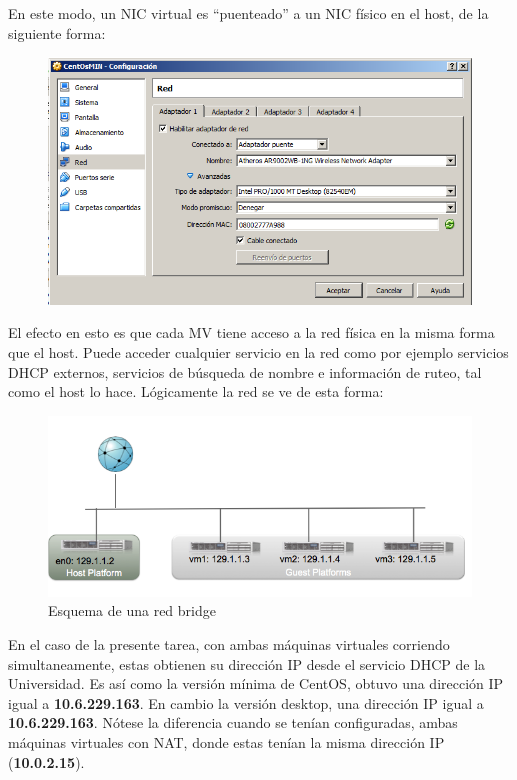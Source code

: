 \documentclass[11pt]{article}
\begin{document}
	En este modo, un NIC virtual es ``puenteado'' a un NIC físico en el host, de la siguiente forma:

	\begin{figure}[ht]
	\center
	\includegraphics[width=0.5\linewidth]{screenshots/MIN/bridge/bridge-mv-min.png}
	\end{figure}

	El efecto en esto es que cada MV tiene acceso a la red física en la misma forma que el host. Puede acceder cualquier servicio en la red como por ejemplo servicios DHCP externos, servicios de búsqueda de nombre e información de ruteo, tal como el host lo hace. Lógicamente la red se ve de esta forma:

	\begin{figure}[ht]
	\center
	\includegraphics[width=0.75\linewidth]{screenshots/bridge-network.png} 
	\caption{Esquema de una red bridge} 
	\end{figure}

En el caso de la presente tarea, con ambas máquinas virtuales corriendo simultaneamente, estas obtienen su dirección IP desde el servicio DHCP de la Universidad. Es así como la versión mínima de CentOS, obtuvo una dirección IP igual a \textbf{10.6.229.163}. En cambio la versión desktop, una dirección IP igual a \textbf{10.6.229.163}. Nótese la diferencia cuando se tenían configuradas, ambas máquinas virtuales con NAT, donde estas tenían la misma dirección IP (\textbf{10.0.2.15}).
\end{document}
